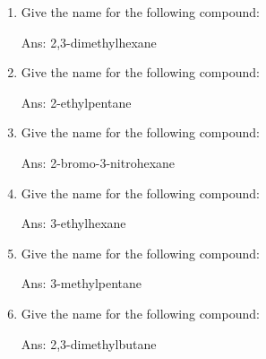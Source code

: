 \documentclass[main.tex]{subfiles}
\begin{document}
\begin{multicols*}{2}
\begin{enumerate}
\item Give the name for the following compound:
\begin{center}
\end{center}
\begin{flushright}\small Ans: 2,3-dimethylhexane\end{flushright}


\item Give the name for the following compound:
\begin{center}
\end{center}
\begin{flushright}\small Ans: 2-ethylpentane\end{flushright}

\item Give the name for the following compound:
\begin{center}
\end{center}
\begin{flushright}\small Ans: 2-bromo-3-nitrohexane\end{flushright}

\item Give the name for the following compound:
\begin{center}
\end{center}
\begin{flushright}\small Ans: 3-ethylhexane\end{flushright}

\item Give the name for the following compound:
\begin{center}
\end{center}
\begin{flushright}\small Ans: 3-methylpentane\end{flushright}

\item Give the name for the following compound:
\begin{center}
\end{center}
\begin{flushright}\small Ans: 2,3-dimethylbutane\end{flushright}








\end{enumerate}
\end{multicols*}
\end{document}
